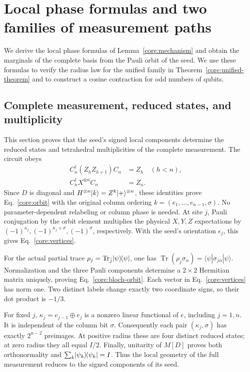 \section{Local phase formulas and two families of measurement paths}
\label{core:appendix}

We derive the local phase formulas of Lemma~\ref{core:mechanism} and obtain the marginals of the complete basis from the Pauli orbit of the seed. We use these formulas to verify the radius law for the unified family in Theorem~\ref{core:unified-theorem} and to construct a cosine contraction for odd numbers of qubits.

\subsection{Complete measurement, reduced states, and multiplicity}
\label{core:full-measurement}

This section proves that the seed's signed local components determine the reduced states and tetrahedral multiplicities of the complete measurement. The circuit obeys
\begin{equation}
 \begin{aligned}
 C_n^\dagger(Z_hZ_{h+1})C_n&=Z_h\quad(h<n),\\
 C_n^\dagger X^{\otimes n}C_n&=Z_n.
 \end{aligned}
\end{equation}
Since $D$ is diagonal and $H^{\otimes n}\lvert k\rangle=Z^k\lvert +\rangle^{\otimes n}$, these identities prove Eq.~\eqref{core:orbit} with the original column ordering $k=(e_1,\ldots,e_{n-1},\sigma)$. No parameter-dependent relabeling or column phase is needed. At site $j$, Pauli conjugation by the orbit element multiplies the physical $X,Y,Z$ expectations by $(-1)^{\kappa_j},(-1)^{\kappa_j+\sigma},(-1)^\sigma$, respectively. With the seed's orientation $\epsilon_j$, this gives Eq.~\eqref{core:vertices}.

For the actual partial trace $\rho_j=\operatorname{Tr}_{\bar j}\lvert \psi\rangle\!\langle \psi\rvert$, one has $\operatorname{Tr}(\rho_j\sigma_\alpha)=\langle\psi|\sigma_{j\alpha}|\psi\rangle$. Normalization and the three Pauli components determine a $2\times2$ Hermitian matrix uniquely, proving Eq.~\eqref{core:bloch-orbit}. Each vector in Eq.~\eqref{core:vertices} has norm one. Two distinct labels change exactly two coordinate signs, so their dot product is $-1/3$.

For fixed $j$, $\kappa_j=e_{j-1}\oplus e_j$ is a nonzero linear functional of $e$, including $j=1,n$. It is independent of the column bit $\sigma$. Consequently each pair $(\kappa_j,\sigma)$ has exactly $2^{n-2}$ preimages. At positive radius these are four distinct reduced states; at zero radius they all equal $I/2$. Finally, unitarity of $M[D]$ proves both orthonormality and $\sum_k\lvert \psi_k\rangle\!\langle \psi_k\rvert=I$. Thus the local geometry of the full measurement reduces to the signed components of its seed.

